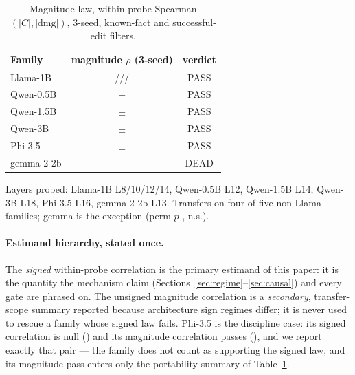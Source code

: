\begin{table}[t]
\centering\small
\caption{Magnitude law, within-probe Spearman$(|C|,|\text{dmg}|)$, 3-seed,
known-fact and successful-edit filters.}
\label{tab:magnitude}
\setlength{\tabcolsep}{3pt}
\begin{tabular}{@{}lcc@{}}
\toprule
Family & magnitude $\rho$ (3-seed) & verdict \\
\midrule
Llama-1B  & \magLlamaLeight{}/\magLlamaLten{}/\textbf{\magLlamaLtwelve{}}/\magLlamaLfourteen{} & PASS \\
Qwen-0.5B & \magQwenHalf{}\,$\pm$\,\magQwenHalfSD{} & PASS \\
Qwen-1.5B & \magQwenFifteen{}\,$\pm$\,\magQwenFifteenSD{} & PASS \\
Qwen-3B   & \magQwenThree{}\,$\pm$\,\magQwenThreeSD{}   & PASS \\
Phi-3.5   & \magPhi{}\,$\pm$\,\magPhiSD{}   & PASS \\
gemma-2-2b & \magGemma{}\,$\pm$\,\magGemmaSD{} & DEAD \\
\bottomrule
\end{tabular}
\par\smallskip
{\footnotesize Layers probed: Llama-1B L8/10/12/14, Qwen-0.5B L12, Qwen-1.5B L14, Qwen-3B L18, Phi-3.5 L16, gemma-2-2b L13. Transfers on four of five non-Llama families; gemma is the exception (perm-$p$ \magGemmaPermP{}, n.s.).\par}
\end{table}

\paragraph{Estimand hierarchy, stated once.} The \emph{signed} within-probe
correlation is the primary estimand of this paper: it is the quantity the
mechanism claim (Sections~\ref{sec:regime}--\ref{sec:causal}) and every gate are
phrased on. The unsigned magnitude correlation is a \emph{secondary},
transfer-scope summary reported because architecture sign regimes differ; it
is never used to rescue a family whose signed law fails. Phi-3.5 is the
discipline case: its signed correlation is null (\phiSigned{}) and its
magnitude correlation passes (\magPhi{}), and we report exactly that pair ---
the family does not count as supporting the signed law, and its magnitude
pass enters only the portability summary of
Table~\ref{tab:magnitude}.

